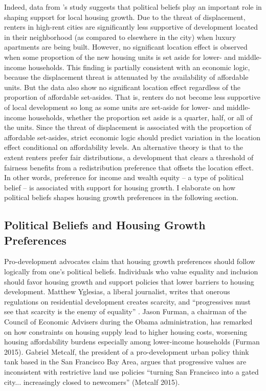 \documentclass[article,11pt]{memoir}
\begin{document}
Indeed, data from \citeauthor{hankinson_when_2018}'s study suggests that political beliefs play an important role in shaping support for local housing growth. Due to the threat of displacement, renters in high-rent cities are significantly less supportive of development located in their neighborhood (as compared to elsewhere in the city) when luxury apartments are being built. However, no significant location effect is observed when some proportion of the new housing units is set aside for lower- and middle-income households. This finding is partially consistent with an economic logic, because the displacement threat is attenuated by the availability of affordable units. But the data also show no significant location effect regardless of the proportion of affordable set-asides. That is, renters do not become less supportive of local development so long as some units are set-aside for lower- and middle-income households, whether the proportion set aside is a quarter, half, or all of the units. Since the threat of displacement is associated with the proportion of affordable set-asides, strict economic logic should predict variation in the location effect conditional on affordability levels. An alternative theory is that to the extent renters prefer fair distributions, a development that clears a threshold of fairness benefits from a redistribution preference that offsets the location effect. In other words, preference for income and wealth equity -- a type of political belief -- is associated with support for housing growth. I elaborate on how political beliefs shapes housing growth preferences in the following section.

\subsection{Political Beliefs and Housing Growth Preferences}

Pro-development advocates claim that housing growth preferences should follow logically from one's political beliefs.  Individuals who value equality and inclusion should favor housing growth and support policies that lower barriers to housing development.  Matthew Yglesias, a liberal journalist, writes that onerous regulations on residential development creates scarcity, and ``progressives must see that scarcity is the enemy of equality'' \citep{yglesias_rent_2012}.  Jason Furman, a chairman of the Council of Economic Advisers during the Obama administration, has remarked on how constraints on housing supply lead to higher housing costs, worsening housing affordability burdens especially among lower-income households (Furman 2015).  Gabriel Metcalf, the president of a pro-development urban policy think tank based in the San Francisco Bay Area, argues that progressive values are inconsistent with restrictive land use policies ``turning San Francisco into a gated city... increasingly closed to newcomers'' (Metcalf 2015).
\end{document}
